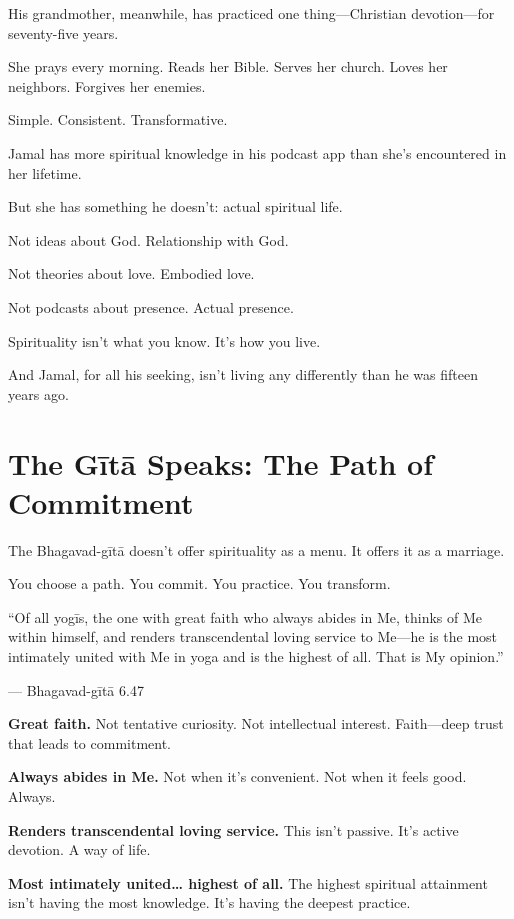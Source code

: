 \documentclass[11pt,twoside]{book}
\begin{document}
His grandmother, meanwhile, has practiced one thing—Christian devotion—for seventy-five years.

She prays every morning. Reads her Bible. Serves her church. Loves her neighbors. Forgives her enemies.

Simple. Consistent. Transformative.

Jamal has more spiritual knowledge in his podcast app than she's encountered in her lifetime.

But she has something he doesn't: actual spiritual life.

Not ideas about God. Relationship with God.

Not theories about love. Embodied love.

Not podcasts about presence. Actual presence.

Spirituality isn't what you know. It's how you live.

And Jamal, for all his seeking, isn't living any differently than he was fifteen years ago.

\section*{The Gītā Speaks: The Path of Commitment}

The Bhagavad-gītā doesn't offer spirituality as a menu. It offers it as a marriage.

You choose a path. You commit. You practice. You transform.

\begin{pullquote}
``Of all yogīs, the one with great faith who always abides in Me, thinks of Me within himself, and renders transcendental loving service to Me—he is the most intimately united with Me in yoga and is the highest of all. That is My opinion.''

--- Bhagavad-gītā 6.47
\end{pullquote}

\textbf{\textbf{Great faith.}} Not tentative curiosity. Not intellectual interest. Faith—deep trust that leads to commitment.

\textbf{\textbf{Always abides in Me.}} Not when it's convenient. Not when it feels good. Always.

\textbf{\textbf{Renders transcendental loving service.}} This isn't passive. It's active devotion. A way of life.

\textbf{\textbf{Most intimately united\ldots{} highest of all.}} The highest spiritual attainment isn't having the most knowledge. It's having the deepest practice.
\end{document}
